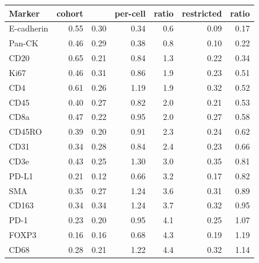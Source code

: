 \begin{tabular}{@{}lrrrrrr@{}}
\toprule
Marker & cohort & \method{} & per-cell & ratio & restricted & ratio \\
\midrule
E-cadherin & 0.55 & 0.30 & 0.34 & 0.6 & 0.09 & 0.17 \\
Pan-CK & 0.46 & 0.29 & 0.38 & 0.8 & 0.10 & 0.22 \\
CD20 & 0.65 & 0.21 & 0.84 & 1.3 & 0.22 & 0.34 \\
Ki67 & 0.46 & 0.31 & 0.86 & 1.9 & 0.23 & 0.51 \\
CD4 & 0.61 & 0.26 & 1.19 & 1.9 & 0.32 & 0.52 \\
CD45 & 0.40 & 0.27 & 0.82 & 2.0 & 0.21 & 0.53 \\
CD8a & 0.47 & 0.22 & 0.95 & 2.0 & 0.27 & 0.58 \\
CD45RO & 0.39 & 0.20 & 0.91 & 2.3 & 0.24 & 0.62 \\
CD31 & 0.34 & 0.28 & 0.84 & 2.4 & 0.23 & 0.66 \\
CD3e & 0.43 & 0.25 & 1.30 & 3.0 & 0.35 & 0.81 \\
PD-L1 & 0.21 & 0.12 & 0.66 & 3.2 & 0.17 & 0.82 \\
SMA & 0.35 & 0.27 & 1.24 & 3.6 & 0.31 & 0.89 \\
CD163 & 0.34 & 0.34 & 1.24 & 3.7 & 0.32 & 0.95 \\
PD-1 & 0.23 & 0.20 & 0.95 & 4.1 & 0.25 & 1.07 \\
FOXP3 & 0.16 & 0.16 & 0.68 & 4.3 & 0.19 & 1.19 \\
CD68 & 0.28 & 0.21 & 1.22 & 4.4 & 0.32 & 1.14 \\
\bottomrule
\end{tabular}
